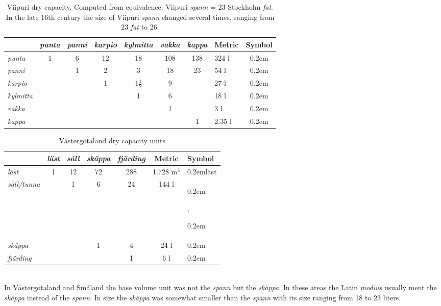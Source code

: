 \documentclass[a4paper]{article}
\newcommand{\samplefont}{\fontsize{16}{16}\abcursivefamily\spaceskip0.2em}
\newcommand{\sample}[1]{{\samplefont #1 \strut}}
\begin{document}
\begin{description}
\begin{table}
\begin{tabular}{lcccccc|lc}
  & \emph{punta} & \emph{panni} & \emph{karpio} & \emph{kylmitta} & \emph{vakka} & \emph{kappa} & Metric &  Symbol \\
  \hline
  \emph{punta}   & 1 &  6 & 12 &  18 & 108 & 138 & 324 l & \sample{\abpund} \\
  \emph{panni}   &   &  1 &  2 &  3  &  18 & 23 & 54 l & \sample{\abspann}\\
  \emph{karpio}  &   &    &  1 &  $1 \frac{1}{2}$ & 9 & & 27 l & \sample{\abkarpio} \\
  \emph{kylmitta} &  &    &    &  1  &   6 &    & 18 l & \sample{\abkylmitta} \\
  \emph{vakka}  &   &    &     &     &   1 &   & 3 l & \sample{\abvakka} \\
  \emph{kappa}  &   &    &     &     &     &    1   & 2.35 l & \sample{\abkappa} \\
\end{tabular}
\caption{Viipuri dry capacity. Computed from equivalence: Viipuri
  \emph{spann} = 23 Stockholm \emph{fat}. In the late  16th century
  the size of Viipuri \emph{spann} changed several times, ranging from
  23 \emph{fat} to 26.}
  \label{tab:viipuri_volume}
\end{table}




\begin{table}
\begin{tabular}{lcccc|cl}
  &  \emph{läst} & \emph{såll} & \emph{skäppa}  & \emph{fjärding} &  Metric &  Symbol \\
  \hline
  \emph{läst}      & 1 & 12 & 72 & 288 & 1.728 m$^3$ & \sample{läst} \\  
  \emph{såll/tunna}     &   &  1 & 6  & 24  & 144 l & \sample{\absoll}, \sample{\abtunna}  \\
  \emph{skäppa}    &   &    & 1  &  4  &  24 l & \sample{\abskappa}  \\
  \emph{fjärding}  &   &    &    &  1  &   6 l & \sample{\abfjarding} \\  
\end{tabular}
  \caption{Västergötaland dry capacity units}
  \label{tab:vastgotaland_volume}
\end{table}


\item [\sample{\abskappa}, \sample{\abmodius} \emph{skäppa}, \emph{modius}] \mbox{} \\
  In Västergötaland and Småland the base volume unit was not the
  \emph{spann} but the \emph{skäppa}. In these areas the Latin
  \emph{modius} usually ment the \emph{skäppa} instead of the
  \emph{spann}. In size the \emph{skäppa} was somewhat smaller than
  the \emph{spann} with its size ranging from 18 to 23 liters.


\end{description}
\end{document}
